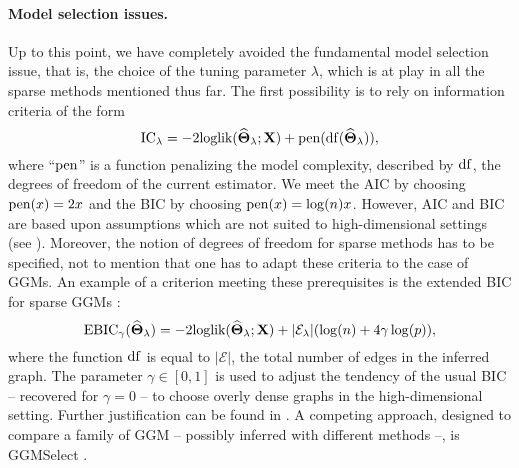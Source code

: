\paragraph*{Model  selection  issues.}   Up  to this  point,  we  have
completely avoided the fundamental model selection issue, that is, the
choice of the tuning parameter $\lambda$,  which is at play in all the
sparse methods mentioned  thus far.  The first possibility  is to rely
on information criteria of the form
\begin{equation*}
  \textrm{IC}_\lambda = - 2 \textrm{loglik}(\widehat{\boldsymbol\Theta}_\lambda;\mathbf{X}) + \mathrm{pen}(\mathrm{df}(\widehat{\boldsymbol\Theta}_\lambda)),
\end{equation*}
where  ``$\mathrm{pen}$''  is  a  function penalizing  the  model  complexity,
described by $\mathrm{df}$,  the degrees of freedom of  the current estimator.
We meet the AIC  by choosing $\mathrm{pen}(x) = 2 x $ and  the BIC by choosing
$\mathrm{pen}(x)  =  \log(n)  x$.   However,   AIC  and  BIC  are  based  upon
assumptions  which are  not suited  to high-dimensional  settings (see
\cite{2012_SS_Giraud}).  Moreover,  the notion  of degrees  of freedom
for sparse methods has to be specified, not to mention that one has to
adapt these criteria  to the case of GGMs.  An  example of a criterion
meeting  these  prerequisites is  the  extended  BIC for  sparse  GGMs
\cite{foygel2010extended}:
\begin{equation}
  \label{eq:EBIC_ggm}
  \text{EBIC}_\gamma(\widehat{\boldsymbol\Theta}_\lambda)  =   -2 \textrm{loglik}
  (\widehat{\boldsymbol\Theta}_\lambda;\mathbf{X}) + |\mathcal{E}_\lambda| (\log(n) + 4 \gamma \log(p) ),
\end{equation}
where the function $\mathrm{df}$ is equal to $|\mathcal{E}|$, the total number
of edges  in the  inferred graph. The  parameter $\gamma\in  [0,1]$ is
used  to  adjust the  tendency  of  the  usual  BIC --  recovered  for
$\gamma=0$ --  to choose overly  dense graphs in  the high-dimensional
setting.      Further     justification     can    be     found     in
\cite{foygel2010extended}. A competing approach, designed to compare a
family  of GGM  -- possibly  inferred  with different  methods --,  is
GGMSelect \cite{2012_SAGMB_Giraud,giraud2008estimation}.

